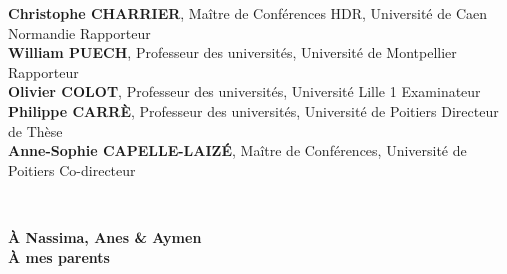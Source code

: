 \begin{titlepage}
\textbf{Christophe CHARRIER}, Maître de Conférences HDR, Université de Caen Normandie \dotfill Rapporteur\\
\vspace{0.2cm}
\textbf{William PUECH},  Professeur des universités, Université de Montpellier \dotfill Rapporteur\\
\vspace{0.2cm}
\textbf{Olivier COLOT}, Professeur des universités, Université Lille 1 \dotfill Examinateur\\


 \vspace{0.2cm}
\textbf{Philippe CARRÈ}, Professeur des universités, Université de Poitiers \dotfill Directeur de Thèse\\
\vspace{0.2cm}
\textbf{Anne-Sophie CAPELLE-LAIZ\'E}, Maître de Conférences, Université de Poitiers \dotfill Co-directeur 
  \end{titlepage}

\newpage
\setcounter{page}{0}
\thispagestyle{empty}
~
\newpage

\setcounter{page}{0}
\begin{flushright}
\renewcommand{\rmdefault}{pzc}
\textbf{\`A Nassima, Anes \& Aymen}\\
\textbf{\`A mes parents}
\end{flushright}
\thispagestyle{empty}



